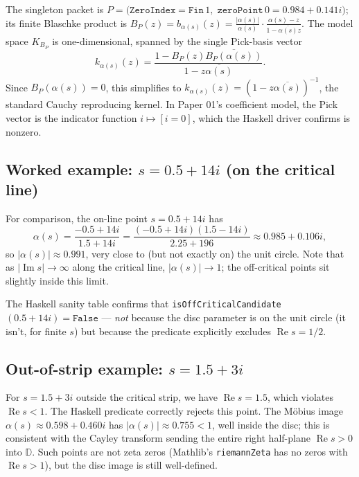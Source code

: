 \documentclass[12pt]{article}
\theoremstyle{definition}
\theoremstyle{remark}
\newcommand{\Disc}{\mathbb{D}}
\newcommand{\re}{\operatorname{Re}}
\newcommand{\im}{\operatorname{Im}}
\begin{document}
The singleton packet is
\(
P = \big(\texttt{ZeroIndex}=\texttt{Fin}\,1,\;
\texttt{zeroPoint}\,0 = 0.984+0.141i\big);
\)
its finite Blaschke product is
\(
B_{P}(z) = b_{\alpha(s)}(z)
= \frac{|\alpha(s)|}{\alpha(s)}\cdot \frac{\alpha(s)-z}{1-\overline{\alpha(s)}z}.
\)
The model space $K_{B_{P}}$ is one-dimensional, spanned by the single
Pick-basis vector
\[
k_{\alpha(s)}(z)
= \frac{1 - B_{P}(z)\overline{B_{P}(\alpha(s))}}{1 - z\overline{\alpha(s)}}.
\]
Since $B_{P}(\alpha(s)) = 0$, this simplifies to
$k_{\alpha(s)}(z) = (1 - z\overline{\alpha(s)})^{-1}$,
the standard Cauchy reproducing kernel. In Paper 01's coefficient model,
the Pick vector is the indicator function $i\mapsto[i = 0]$, which the
Haskell driver confirms is nonzero.

\subsection{Worked example: $s = 0.5 + 14i$ (on the critical line)}

For comparison, the on-line point $s = 0.5 + 14i$ has
\[
\alpha(s) = \frac{-0.5 + 14i}{1.5 + 14i}
          = \frac{(-0.5 + 14i)(1.5 - 14i)}{2.25 + 196}
          \approx 0.985 + 0.106i,
\]
so $|\alpha(s)|\approx 0.991$, very close to (but not exactly on) the
unit circle. Note that as $|\im s|\to\infty$ along the critical line,
$|\alpha(s)|\to 1$; the off-critical points sit slightly inside this
limit.

The Haskell sanity table confirms that
\texttt{isOffCriticalCandidate}$(0.5+14i) = \texttt{False}$ — \emph{not}
because the disc parameter is on the unit circle (it isn't, for finite
$s$) but because the predicate explicitly excludes
$\re s = 1/2$.

\subsection{Out-of-strip example: $s = 1.5 + 3i$}

For $s = 1.5 + 3i$ outside the critical strip, we have $\re s = 1.5$,
which violates $\re s < 1$. The Haskell predicate correctly rejects this
point. The Möbius image $\alpha(s) \approx 0.598 + 0.460i$ has
$|\alpha(s)|\approx 0.755 < 1$, well inside the disc; this is consistent
with the Cayley transform sending the entire right half-plane $\re s>0$
into $\Disc$. Such points are not zeta zeros (Mathlib's
\texttt{riemannZeta} has no zeros with $\re s > 1$), but the disc image
is still well-defined.

\end{document}
